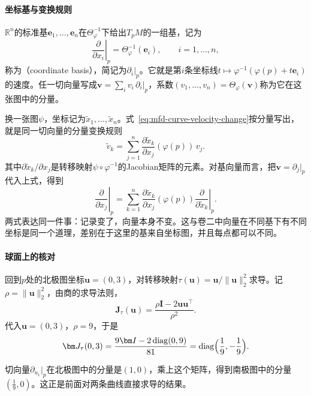 \paragraph{坐标基与变换规则}
$\mathbb R^n$的标准基$\bm e_1,\ldots,\bm e_n$在$\Theta_\varphi^{-1}$下给出$T_pM$的一组基，记为
\begin{equation}
\left.\frac{\partial}{\partial x_i}\right|_p=\Theta_\varphi^{-1}(\bm e_i),\qquad i=1,\ldots,n,
\label{eq:mfd-coordinate-basis}
\end{equation}
称为（coordinate basis），简记为$\partial_i|_p$。它就是第$i$条坐标线$t\mapsto\varphi^{-1}(\varphi(p)+t\bm e_i)$的速度。任一切向量写成$\bm v=\sum_i v_i\,\partial_i|_p$，系数$(v_1,\ldots,v_n)=\Theta_\varphi(\bm v)$称为它在这张图中的分量。

换一张图$\psi$，坐标记为$\tilde x_1,\ldots,\tilde x_n$。式~\eqref{eq:mfd-curve-velocity-change}按分量写出，就是同一切向量的分量变换规则
\begin{equation}
\tilde v_k=\sum_{j=1}^n\frac{\partial\tilde x_k}{\partial x_j}(\varphi(p))\,v_j .
\label{eq:mfd-tangent-change}
\end{equation}
其中$\partial\tilde x_k/\partial x_j$是转移映射$\psi\circ\varphi^{-1}$的Jacobian矩阵的元素。对基向量而言，把$\bm v=\partial_j|_p$代入上式，得到
\begin{equation}
\left.\frac{\partial}{\partial x_j}\right|_p
=\sum_{k=1}^n\frac{\partial\tilde x_k}{\partial x_j}(\varphi(p))\left.\frac{\partial}{\partial\tilde x_k}\right|_p .
\label{eq:mfd-tangent-basis-change}
\end{equation}
两式表达同一件事：记录变了，向量本身不变。这与卷二中向量在不同基下有不同坐标是同一个道理，差别在于这里的基来自坐标图，并且每点都可以不同。

\paragraph{球面上的核对}
回到$p$处的北极图坐标$\bm u=(0,3)$，对转移映射$\tau(\bm u)=\bm u/\lVert\bm u\rVert_2^2$求导。记$\rho=\lVert\bm u\rVert_2^2$，由商的求导法则，
\begin{equation}
\bm J_\tau(\bm u)=\frac{\rho\bm I-2\bm u\bm u^\top}{\rho^2}.
\label{eq:mfd-inversion-jacobian}
\end{equation}
代入$\bm u=(0,3)$，$\rho=9$，于是
\[
\bm J_\tau(0,3)=\frac{9\bm I-2\operatorname{diag}(0,9)}{81}=\operatorname{diag}\Bigl(\frac19,-\frac19\Bigr).
\]

切向量$\partial_{u_1}|_p$在北极图中的分量是$(1,0)$，乘上这个矩阵，得到南极图中的分量$(\tfrac19,0)$。这正是前面对两条曲线直接求导的结果。

